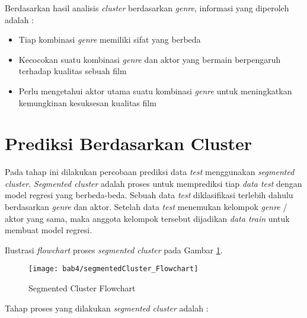 Berdasarkan hasil analisis \textit{cluster} berdasarkan \textit{genre}, informasi yang diperoleh adalah : 

\begin{itemize}
\item Tiap kombinasi \textit{genre} memiliki sifat yang berbeda
\item Kecocokan suatu kombinasi \textit{genre} dan aktor yang bermain berpengaruh terhadap kualitas sebuah film
\item Perlu mengetahui aktor utama suatu kombinasi \textit{genre} untuk meningkatkan kemungkinan kesuksesan kualitas film
\end{itemize} 


 
\section{Prediksi Berdasarkan Cluster}
Pada tahap ini dilakukan percobaan prediksi data \textit{test} menggunakan \textit{segmented cluster}. \textit{Segmented cluster} adalah proses untuk memprediksi tiap \textit{data test} dengan model regresi yang berbeda-beda. Sebuah data \textit{test} diklasifikasi terlebih dahulu berdasarkan \textit{genre} dan aktor. Setelah data \textit{test} menemukan kelompok \textit{genre} / aktor yang sama, maka anggota kelompok tersebut dijadikan \textit{data train} untuk membuat model regresi.  

Ilustrasi \textit{flowchart} proses \textit{segmented cluster} pada Gambar \ref{fig:segmentedCluster_Flowchart}.


\begin{figure}[H]
	\centering  
	\texttt{[image: bab4/segmentedCluster\_Flowchart]}   
	\caption{Segmented Cluster Flowchart}	\label{fig:segmentedCluster_Flowchart} 
\end{figure}


Tahap proses yang dilakukan \textit{segmented cluster} adalah : 


